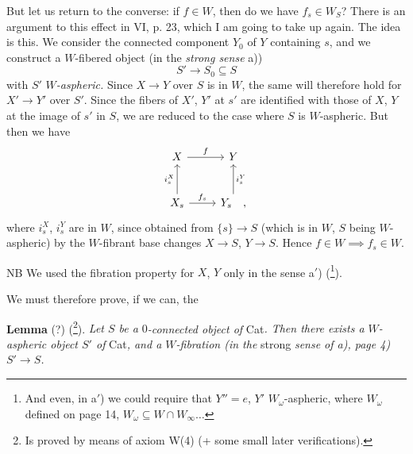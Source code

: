 \documentclass[11pt]{article}
\newcommand{\printedpage}[1]{\marginpar{\footnotesize p.~#1}}
\newcommand{\msp}[1]{\marginpar{\footnotesize [#1]}}
\begin{document}
But let us return to the converse: if $f \in W$, then do we have $f_s \in W_S$? There is an argument to this effect in VI, p. 23, which I am going to take up again. The idea is this. We consider the connected component $Y_0$ of $Y$ containing $s$, and we construct a
\msp{page 7}
$W$-fibered object (in the \textit{strong sense} a))
\[ S' \longrightarrow S_0 \subseteq S \]
with $S'$ \textit{$W$-aspheric.} Since $X \longrightarrow Y$ over $S$ is in $W$, the same will therefore hold for $X' \longrightarrow Y'$ over $S'$. Since the fibers of $X'$, $Y'$ at $s'$ are identified with those of $X$, $Y$ at the image of $s'$ in $S$, we are reduced to the case where $S$ is $W$-aspheric. But then we have
\[
\begin{tikzcd}[row sep=large]
X \arrow[r, "f"] & Y \\
X_s \arrow[u, "i_s^X"] \arrow[r, "f_s"] & Y_s \arrow[u, "i_s^Y"'] \quad ,
\end{tikzcd}
\]
\printedpage{7}
where $i_s^X$, $i_s^Y$ are in $W$, since obtained from $\{s\} \longrightarrow S$ (which is in $W$, $S$ being $W$-aspheric) by the $W$-fibrant base changes $X \longrightarrow S$, $Y \longrightarrow S$. Hence $f \in W \implies f_s \in W$.

NB We used the fibration property for $X$, $Y$ only in the sense a$'$) (\footnote[10]{And even, in a$'$) we could require that $Y'' = e$, $Y'$ $W_\omega$-aspheric, where $W_\omega$ defined on page 14, $W_\omega \subseteq W \cap W_\infty \ldots$}).

We must therefore prove, if we can, the

\textbf{Lemma} (?) (\footnote[11]{Is proved by means of axiom W(4) (+ some small later verifications).}). \textit{Let $S$ be a} $0$\textit{-connected object of} Cat\textit{. Then there exists a $W$-aspheric object $S'$ of} Cat\textit{, and a $W$-fibration (in the} strong \textit{sense of a), page 4) $S' \longrightarrow S$.}
\end{document}
